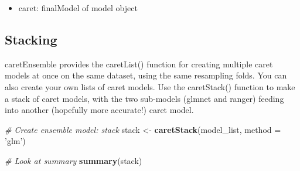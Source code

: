 \documentclass[]{book}
\newenvironment{Shaded}{\begin{snugshade}}{\end{snugshade}}
\newcommand{\KeywordTok}[1]{\textcolor[rgb]{0.13,0.29,0.53}{\textbf{#1}}}
\newcommand{\DataTypeTok}[1]{\textcolor[rgb]{0.13,0.29,0.53}{#1}}
\newcommand{\StringTok}[1]{\textcolor[rgb]{0.31,0.60,0.02}{#1}}
\newcommand{\CommentTok}[1]{\textcolor[rgb]{0.56,0.35,0.01}{\textit{#1}}}
\newcommand{\OtherTok}[1]{\textcolor[rgb]{0.56,0.35,0.01}{#1}}
\newcommand{\OperatorTok}[1]{\textcolor[rgb]{0.81,0.36,0.00}{\textbf{#1}}}
\newcommand{\NormalTok}[1]{#1}
\providecommand{\tightlist}{%
  \setlength{\itemsep}{0pt}\setlength{\parskip}{0pt}}
\begin{document}
\begin{Shaded}
\end{Shaded}

\begin{itemize}
\tightlist
\item
  caret: finalModel of model object
\end{itemize}

\subsection{Stacking}\label{stacking}

caretEnsemble provides the caretList() function for creating multiple
caret models at once on the same dataset, using the same resampling
folds. You can also create your own lists of caret models. Use the
caretStack() function to make a stack of caret models, with the two
sub-models (glmnet and ranger) feeding into another (hopefully more
accurate!) caret model.

\begin{Shaded}
\begin{Highlighting}[]
\CommentTok{# Create ensemble model: stack}
\NormalTok{stack <-}\StringTok{ }\KeywordTok{caretStack}\NormalTok{(model_list, }\DataTypeTok{method =} \StringTok{'glm'}\NormalTok{)}

\CommentTok{# Look at summary}
\KeywordTok{summary}\NormalTok{(stack)}
\end{Highlighting}
\end{Shaded}
\end{document}
